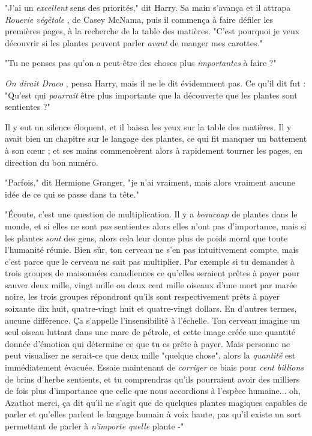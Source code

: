 "J'ai un \emph{excellent}  sens des priorités," dit Harry. Sa main s'avança et il attrapa \emph{Rouerie végétale} , de Casey McNama, puis il commença à faire défiler les premières pages, à la recherche de la table des matières. "C'est pourquoi je veux découvrir si les plantes peuvent parler \emph{avant}  de manger mes carottes."

"Tu ne penses pas qu'on a peut-être des choses plus \emph{importantes}  à faire ?"

\emph{On dirait Draco} , pensa Harry, mais il ne le dit évidemment pas. Ce qu'il dit fut : "Qu'est qui \emph{pourrait}  être plus importante que la découverte que les plantes sont sentientes ?"

Il y eut un silence éloquent, et il baissa les yeux sur la table des matières. Il y avait bien un chapitre sur le langage des plantes, ce qui fit manquer un battement à son cœur ; et ses mains commencèrent alors à rapidement tourner les pages, en direction du bon numéro.

"Parfois," dit Hermione Granger, "je n'ai vraiment, mais alors vraiment aucune idée de ce qui se passe dans ta tête."

"Écoute, c'est une question de multiplication. Il y a \emph{beaucoup}  de plantes dans le monde, et si elles ne sont \emph{pas}  sentientes alors elles n'ont pas d'importance, mais si les plantes \emph{sont}  des gens, alors cela leur donne plus de poids moral que toute l'humanité réunie. Bien sûr, ton cerveau ne s'en pas intuitivement compte, mais c'est parce que le cerveau ne sait pas multiplier. Par exemple si tu demandes à trois groupes de maisonnées canadiennes ce qu'elles seraient prêtes à payer pour sauver deux mille, vingt mille ou deux cent mille oiseaux d'une mort par marée noire, les trois groupes répondront qu'ils sont respectivement prêts à payer soixante dix huit, quatre-vingt huit et quatre-vingt dollars. En d'autres termes, aucune différence. Ça s'appelle l'insensibilité à l'échelle. Ton cerveau imagine un seul oiseau luttant dans une mare de pétrole, et cette image créée une quantité donnée d'émotion qui détermine ce que tu es prête à payer. Mais personne ne peut visualiser ne serait-ce que deux mille "quelque chose", alors la \emph{quantité}  est immédiatement évacuée. Essaie maintenant de \emph{corriger}  ce biais pour \emph{cent billions}  de brins d'herbe sentients, et tu comprendras qu'ils pourraient avoir des milliers de fois plus d'importance que celle que nous accordions à l'espèce humaine... oh, Azathot merci, ça dit qu'il ne s'agit que de quelques plantes magiques capables de parler et qu'elles parlent le langage humain à voix haute, pas qu'il existe un sort permettant de parler à \emph{n'importe quelle}  plante -"

